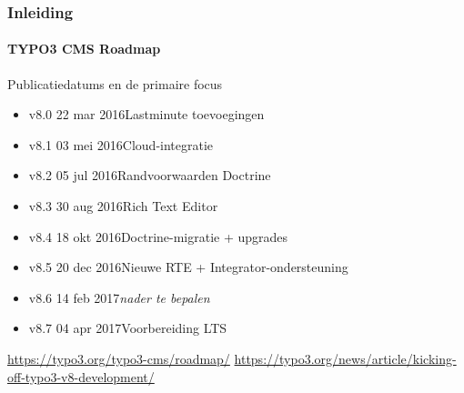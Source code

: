 \begin{frame}[fragile]
	\frametitle{Inleiding}
	\framesubtitle{TYPO3 CMS Roadmap}

	Publicatiedatums en de primaire focus

	\begin{itemize}

		\item v8.0 \tabto{1.1cm}22 mar 2016\tabto{3.4cm}Lastminute toevoegingen
		\item v8.1 \tabto{1.1cm}03 mei 2016\tabto{3.4cm}Cloud-integratie
		\item v8.2 \tabto{1.1cm}05 jul 2016\tabto{3.4cm}Randvoorwaarden Doctrine
		\item v8.3 \tabto{1.1cm}30 aug 2016\tabto{3.4cm}Rich Text Editor
		\item v8.4 \tabto{1.1cm}18 okt 2016\tabto{3.4cm}Doctrine-migratie + upgrades
		\item
			\begingroup
				\color{typo3orange}
					v8.5 \tabto{1.1cm}20 dec 2016\tabto{3.4cm}Nieuwe RTE + Integrator-ondersteuning
			\endgroup
		\item v8.6 \tabto{1.1cm}14 feb 2017\tabto{3.4cm}\textit{nader te bepalen}
		\item v8.7 \tabto{1.1cm}04 apr 2017\tabto{3.4cm}Voorbereiding LTS

	\end{itemize}

	\smaller
		\url{https://typo3.org/typo3-cms/roadmap/}\newline
		\url{https://typo3.org/news/article/kicking-off-typo3-v8-development/}
	\normalsize

\end{frame}

